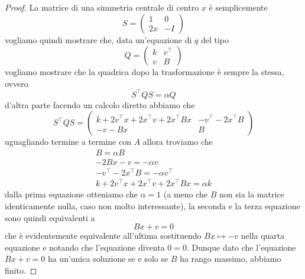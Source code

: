 \documentclass[11pt]{scrartcl}
\begin{document}
	\begin{proof}
		La matrice di una simmetria centrale di centro $x$ è semplicemente
		$$S=
		\left(
		\begin{array}{c|c}
			1 & 0 \\
			\hline
			2x & -I
		\end{array}
		\right)
		$$
		vogliamo quindi mostrare che, data un'equazione di $q$ del tipo
		$$Q=
		\left(
		\begin{array}{c|c}
			k & v^\intercal \\
			\hline
			v & B
		\end{array}
		\right)
		$$
		vogliamo mostrare che la quadrica dopo la trasformazione è sempre la stessa, ovvero
		$$S^\intercal Q S = \alpha Q$$
		d'altra parte facendo un calcolo diretto abbiamo che
		$$
		S^\intercal Q S = 
		\left(
		\begin{array}{c|c}
			k+2v^\intercal x +2x^\intercal v + 2x^\intercal B x & -v^\intercal -2x^\intercal B \\
			\hline 
			-v-Bx & B
		\end{array}
		\right)
		$$
		uguagliando termine a termine con $A$ allora troviamo che
		\begin{gather*}
			B = \alpha B \\
			-2Bx-v=-\alpha v  \\
			-v^\intercal -2x^\intercal B = -\alpha v^\intercal \\
			k +2v^\intercal x + 2x^\intercal v + 2x^\intercal B x = \alpha k
		\end{gather*}
		dalla prima equazione otteniamo che $\alpha = 1$ (a meno che $B$ non sia la matrice identicamente nulla, caso non molto interessante), la seconda e la terza equazione sono quindi equivalenti a
		$$Bx+v=0$$
		che è evidentemente equivalente all'ultima sostituendo $Bx\mapsto -v$ nella quarta equazione e notando che l'equazione diventa $0=0$. Dunque dato che l'equazione $Bx+v=0$ ha un'unica soluzione se e solo se $B$ ha rango massimo, abbiamo finito. 
	\end{proof}
\end{document}
